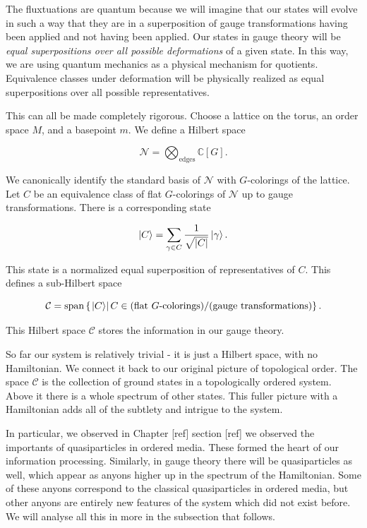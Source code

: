 \documentclass{article}
\theoremstyle{definition}
\newcommand{\CC}{\mathbb{C}}
\newcommand{\NN}{\mathcal{N}}
\newcommand{\Cc}{\mathcal{C}}
\newcommand{\0}{\left|0\right>}
\newcommand{\1}{\left|1\right>}
\numberwithin{figure}{section}
\begin{document}
The fluxtuations are quantum because we will imagine that our states will evolve in such a way that they are in a superposition of gauge transformations having been applied and not having been applied. Our states in gauge theory will be \textit{equal superpositions over all possible deformations} of a given state. In this way, we are using quantum mechanics as a physical mechanism for quotients. Equivalence classes under deformation will be physically realized as equal superpositions over all possible representatives.

This can all be made completely rigorous. Choose a lattice on the torus, an order space $M$, and a basepoint $m$. We define a Hilbert space

$$\NN=\bigotimes_{\text{edges}}\CC[G].$$

We canonically identify the standard basis of $\NN$ with $G$-colorings of the lattice. Let $C$ be an equivalence class of flat $G$-colorings of $\NN$ up to gauge transformations. There is a corresponding state

$$\ket{C}=\sum_{\gamma \in C}\frac{1}{\sqrt{|C|}}\ket{\gamma}.$$

This state is a normalized equal superposition of representatives of $C$. This defines a sub-Hilbert space

$$\Cc=\text{span}\left\{\left.\ket{C}\right| C\in \text{(flat $G$-colorings)}/\text{(gauge transformations)}\right\}.$$

This Hilbert space $\Cc$ stores the information in our gauge theory.

So far our system is relatively trivial - it is just a Hilbert space, with no Hamiltonian. We connect it back to our original picture of topological order. The space $\Cc$ is the collection of ground states in a topologically ordered system. Above it there is a whole spectrum of other states. This fuller picture with a Hamiltonian adds all of the subtlety and intrigue to the system.

In particular, we observed in Chapter [ref] section [ref] we observed the importants of quasiparticles in ordered media. These formed the heart of our information processing. Similarly, in gauge theory there will be quasiparticles as well, which appear as anyons higher up in the spectrum of the Hamiltonian. Some of these anyons correspond to the classical quasiparticles in ordered media, but other anyons are entirely new features of the system which did not exist before. We will analyse all this in more in the subsection that follows.
\end{document}
